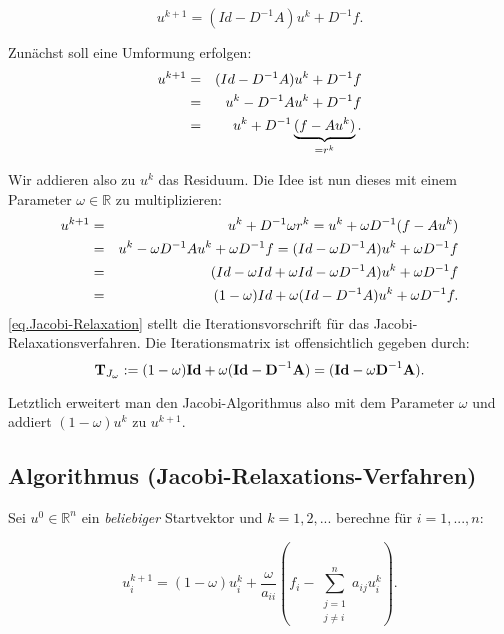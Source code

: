 \begin{equation}
u^{k+1} = (Id - D^{-1}A)u^{k} + D^{-1}f.
\end{equation}

Zunächst soll eine Umformung erfolgen:
\begin{eqnarray}
u^{k+1} &=& (Id - D^{-1}A)u^{k} + D^{-1}f \notag \\
&=& u^{k} - D^{-1}Au^{k} + D^{-1}f \notag \\
&=& u^{k} + D^{-1} \underbrace{(f - Au^{k})}_{= r^{k}}.
\end{eqnarray}

Wir addieren also zu $u^{k}$ das Residuum. Die Idee ist nun dieses mit einem Parameter $\omega \in \mathbb{R}$ zu multiplizieren:
\begin{eqnarray}
u^{k+1} &=& u^{k} + D^{-1} \omega r^{k} = u^{k} + \omega D^{-1} (f - Au^{k}) \notag \\
&=& u^{k} - \omega D^{-1} Au^{k} + \omega D^{-1}f = (Id - \omega D^{-1} A)u^{k} + \omega D^{-1}f \notag \\
&=& (Id - \omega Id + \omega Id - \omega D^{-1} A)u^{k} + \omega D^{-1}f \notag \\
&=& (1 - \omega)Id + \omega(Id - D^{-1}A) u^{k} + \omega D^{-1}f.\label{eq.Jacobi-Relaxation}
\end{eqnarray}
\autoref{eq.Jacobi-Relaxation} stellt die Iterationsvorschrift für das Jacobi-Relaxationsverfahren. Die Iterationsmatrix ist offensichtlich gegeben durch:
\begin{equation}
{\textbf{T}}_{J_{\omega}} := (1 - \omega) {\textbf{Id}} + \omega({\textbf{Id}} - {\textbf{D}}^{-1} {\textbf{A}}) = ({\textbf{Id}} - \omega {\textbf{D}}^{-1} {\textbf{A}}).
\end{equation}

Letztlich erweitert man den Jacobi-Algorithmus also mit dem Parameter $\omega$ und addiert $(1 - \omega)u^{k}$ zu $u^{k+1}$.

\subsection{Algorithmus (Jacobi-Relaxations-Verfahren)}\label{ss.Algorithmus Jacobi Relax}

Sei $u^{0} \in \mathbb{R}^{n}$ ein \textit{beliebiger} Startvektor und $k=1,2,...$ berechne für $i=1,...,n$:

\begin{equation}
u^{k+1}_{i} = (1 - \omega)u^{k}_{i} + \frac {\omega} {a_{ii}} (f_{i} - \sum_{\substack{j = 1 \\ j \ne i}}^{n} a_{ij}u^{k}_{i}).
\end{equation}


